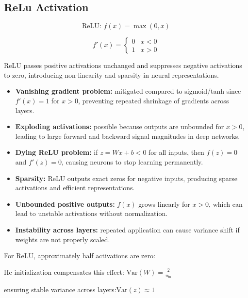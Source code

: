 \documentclass[10pt,a4paper]{article}
\begin{document}
\subsection{ReLu Activation}

$$ \text{ReLU: } f(x) = \max(0, x)$$

\[
f'(x) =
\begin{cases}
0 & x < 0 \\
1 & x > 0
\end{cases}
\]

ReLU passes positive activations unchanged and suppresses negative activations to zero, introducing non-linearity and sparsity in neural representations.

\begin{itemize}

\item \textbf{Vanishing gradient problem:} mitigated compared to sigmoid/tanh since $f'(x)=1$ for $x>0$, preventing repeated shrinkage of gradients across layers.

\item \textbf{Exploding activations:} possible because outputs are unbounded for $x>0$, leading to large forward and backward signal magnitudes in deep networks.

\item \textbf{Dying ReLU problem:} if $z = Wx + b < 0$ for all inputs, then $f(z)=0$ and $f'(z)=0$, causing neurons to stop learning permanently.

\item \textbf{Sparsity:} ReLU outputs exact zeros for negative inputs, producing sparse activations and efficient representations.

\item \textbf{Unbounded positive outputs:} $f(x)$ grows linearly for $x>0$, which can lead to unstable activations without normalization.

\item \textbf{Instability across layers:} repeated application can cause variance shift if weights are not properly scaled.

\end{itemize}

For ReLU, approximately half activations are zero:

He initialization compensates this effect: $\mathrm{Var}(W) = \frac{2}{n_{\text{in}}}$

ensuring stable variance across layers:$\mathrm{Var}(z) \approx 1$
\end{document}
